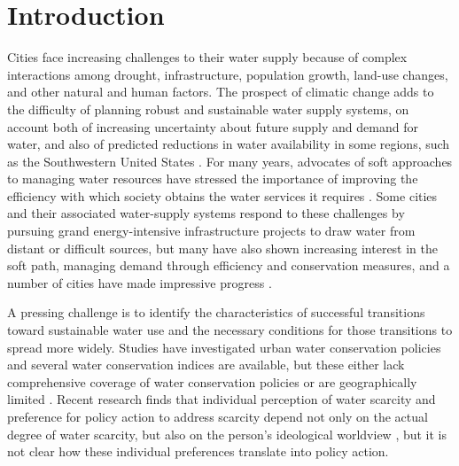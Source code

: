 \documentclass[draft,linenumbers]{agujournal}
\begin{document}
\section{Introduction}
Cities face increasing challenges to their water supply because of complex
interactions among drought, infrastructure, population growth, land-use changes,
and other natural and human factors.
The prospect of climatic change adds to the difficulty of planning robust and
sustainable water supply systems, on account both of  increasing uncertainty
about future supply and demand for water, and also of predicted reductions in
water availability in some regions, such as the Southwestern United States
\citep{gcrp:natl.assessment.3:2014}.
For many years, advocates of soft approaches to managing water resources have
stressed the importance of improving  the efficiency with which society obtains
the water services it requires  \citep{gleick:soft.water.paths:2002}.
Some cities and their associated water-supply systems respond to these
challenges by pursuing grand energy-intensive infrastructure projects to draw
water from distant or difficult sources, but many have also shown increasing
interest in the soft path, managing demand through efficiency and conservation
measures, and a number of cities have made impressive progress
\citep{fleck:fighting:2016}.

A pressing challenge is to identify the characteristics of successful
transitions toward sustainable water use and the necessary conditions for those
transitions to spread more widely.
Studies have investigated urban water conservation policies and several water
conservation indices are available, but these either lack comprehensive coverage
of water conservation policies or are geographically limited
\citep{hess:vwci:2017,sauri:conservation:2013,maggioni:conservation:2014}.
Recent research finds that individual perception of water scarcity and
preference for policy action to address scarcity depend not only on the actual
degree of water scarcity, but also on the person's ideological worldview
\citep{switzer:green.lenses:2016}, but it is not clear how these individual
preferences translate into policy action.
\end{document}
